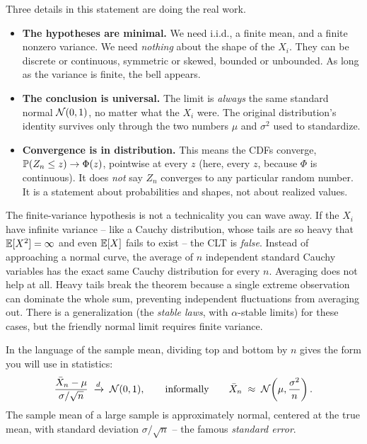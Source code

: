Three details in this statement are doing the real work.

\begin{itemize}
\item \textbf{The hypotheses are minimal.} We need i.i.d., a finite mean, and a finite
nonzero variance. We need \emph{nothing} about the shape of the $X_i$. They can be
discrete or continuous, symmetric or skewed, bounded or unbounded. As long as the
variance is finite, the bell appears.
\item \textbf{The conclusion is universal.} The limit is \emph{always} the same standard
normal $\Normal(0,1)$, no matter what the $X_i$ were. The original distribution's
identity survives only through the two numbers $\mu$ and $\sigma^2$ used to standardize.
\item \textbf{Convergence is in distribution.} This means the CDFs converge,
$\P(Z_n \le z) \to \Phi(z)$, pointwise at every $z$ (here, every $z$, because $\Phi$ is
continuous). It does \emph{not} say $Z_n$ converges to any particular random number. It
is a statement about probabilities and shapes, not about realized values.
\end{itemize}

\begin{trapbox}
The finite-variance hypothesis is not a technicality you can wave away. If the $X_i$ have
infinite variance -- like a Cauchy distribution, whose tails are so heavy that
$\E[X^2] = \infty$ and even $\E[X]$ fails to exist -- the CLT is \emph{false}. Instead of approaching a normal curve, the
average of $n$ independent standard Cauchy variables has the exact same
Cauchy distribution for every $n$. Averaging does not help at all. Heavy tails
break the theorem because a single extreme observation can dominate the whole sum,
preventing independent fluctuations from averaging out. There is a generalization (the
\emph{stable laws}, with $\alpha$-stable limits) for these cases, but the friendly normal
limit requires finite variance.
\end{trapbox}

In the language of the sample mean, dividing top and bottom by $n$ gives the form you
will use in statistics:
\[
  \frac{\bar X_n - \mu}{\sigma/\sqrt{n}} \;\dto\; \Normal(0,1),
  \qquad \text{informally} \qquad
  \bar X_n \;\approx\; \Normal\!\left(\mu, \frac{\sigma^2}{n}\right).
\]
The sample mean of a large sample is approximately normal, centered at the true mean,
with standard deviation $\sigma/\sqrt{n}$ -- the famous \emph{standard error}.

